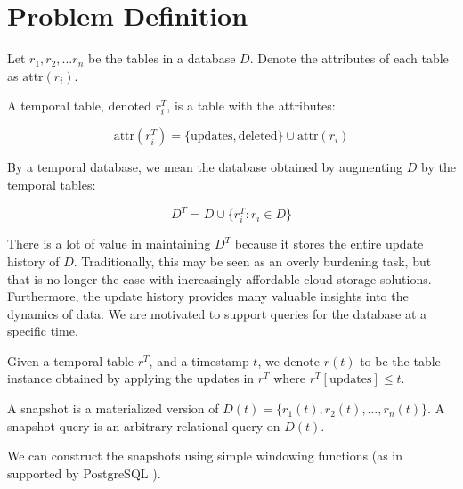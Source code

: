 \newcommand{\attr}{\mathrm{attr}}

\section{Problem Definition}

\begin{definition}
    Let $r_1, r_2, \dots r_n$ be the tables
    in a database $D$.  Denote the attributes
    of each table as $\attr(r_i)$.

    A temporal table, denoted $r_i^T$, is
    a table with the attributes:

    $$\attr(r_i^T) = \{\mathrm{updates}, \mathrm{deleted}\} \cup \attr(r_i)$$

    By a temporal database, we mean the database obtained by augmenting
    $D$ by the temporal tables:

    $$ D^T = D \cup \{r_i^T: r_i\in D\} $$
\end{definition}

There is a lot of value in maintaining $D^T$ because it stores the entire update
history of $D$.  Traditionally, this may be seen as an overly burdening task,
but that is no longer the case with increasingly affordable cloud storage
solutions.  Furthermore, the update history provides many valuable insights into
the dynamics of data. We are motivated to support queries for the database at a
specific time.

\begin{definition}
    Given a temporal table $r^T$, and a timestamp $t$, we denote
    $r(t)$ to be the table instance obtained by applying the updates
    in $r^T$ where $r^T[\mathrm{updates}] \leq t$.

    A snapshot is a materialized version of $D(t) = \{r_1(t), r_2(t), \dots,
    r_n(t)\}$.  A snapshot query is an arbitrary relational query on $D(t)$.
\end{definition}

We can construct the snapshots using simple windowing functions (as in supported
by PostgreSQL \cite{momjian2001postgresql}).


\vspace{1em}

